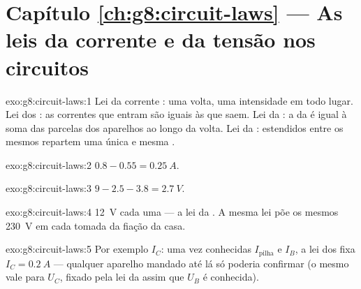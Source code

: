 \section*{Capítulo \ref{ch:g8:circuit-laws} --- As leis da corrente e da tensão nos circuitos}

\begin{solution}{exo:g8:circuit-laws:1}
Lei da corrente : uma volta, uma intensidade em todo lugar.
Lei dos : as correntes que entram são iguais às que saem. Lei da
 : a  da  é igual à soma das parcelas dos
aparelhos ao longo da volta. Lei da  : 
estendidos entre os mesmos  repartem uma única e mesma .
\end{solution}

\begin{solution}{exo:g8:circuit-laws:2}
$0.8 - 0.55 = \qty{0.25}{A}$.
\end{solution}

\begin{solution}{exo:g8:circuit-laws:3}
$9 - 2.5 - 3.8 = \qty{2.7}{V}$.
\end{solution}

\begin{solution}{exo:g8:circuit-laws:4}
\qty{12}{V} cada uma --- a lei da  . A mesma lei põe
os mesmos \qty{230}{V} em cada tomada da fiação  da casa.
\end{solution}

\begin{solution}{exo:g8:circuit-laws:5}
Por exemplo $I_C$: uma vez conhecidas $I_{\text{pilha}}$ e $I_B$, a
lei dos  fixa $I_C = \qty{0.2}{A}$ --- qualquer aparelho mandado
até lá só poderia confirmar (o mesmo vale para $U_C$, fixado pela lei
da   assim que $U_B$ é conhecida).
\end{solution}

